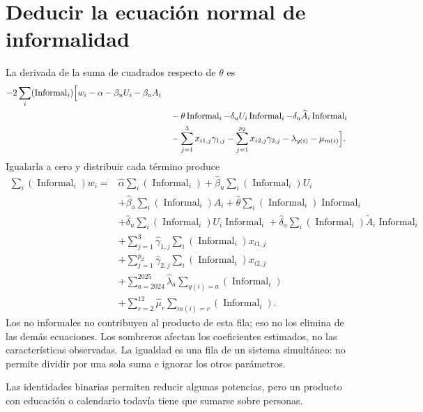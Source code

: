 \documentclass[11pt,a4paper]{article}
\begin{document}
\section{Deducir la ecuación normal de informalidad}
La derivada de la suma de cuadrados respecto de $\theta$ es
\[
\begin{aligned}-2\sum_i(\operatorname{Informal}_i)\Bigl[w_i-\alpha-\beta_uU_i-\beta_aA_i\\&\quad-\theta\operatorname{Informal}_i-\delta_uU_i\operatorname{Informal}_i-\delta_a\widetilde A_i\operatorname{Informal}_i\\&\quad-\sum_{j=1}^3x_{i1,j}\gamma_{1,j}-\sum_{j=1}^{p_2}x_{i2,j}\gamma_{2,j}-\lambda_{y(i)}-\mu_{m(i)}\Bigr].\end{aligned}
\]
Igualarla a cero y distribuir cada término produce
\[
\begin{aligned}
\sum_i(\operatorname{Informal}_i)w_i={}&\widehat\alpha\sum_i(\operatorname{Informal}_i)
+\widehat\beta_u\sum_i(\operatorname{Informal}_i)U_i\\
&+\widehat\beta_a\sum_i(\operatorname{Informal}_i)A_i
+\widehat\theta\sum_i(\operatorname{Informal}_i)\operatorname{Informal}_i\\
&+\widehat\delta_u\sum_i(\operatorname{Informal}_i)U_i\operatorname{Informal}_i
+\widehat\delta_a\sum_i(\operatorname{Informal}_i)\widetilde A_i\operatorname{Informal}_i\\
&+\sum_{j=1}^3\widehat\gamma_{1,j}\sum_i(\operatorname{Informal}_i)x_{i1,j}\\
&+\sum_{j=1}^{p_2}\widehat\gamma_{2,j}\sum_i(\operatorname{Informal}_i)x_{i2,j}\\
&+\sum_{a=2024}^{2025}\widehat\lambda_a\sum_{y(i)=a}(\operatorname{Informal}_i)\\
&+\sum_{r=2}^{12}\widehat\mu_r\sum_{m(i)=r}(\operatorname{Informal}_i).\end{aligned}
\]
Los no informales no contribuyen al producto de esta fila; eso no los elimina de las demás ecuaciones.
Los sombreros afectan los coeficientes estimados, no las características observadas. La igualdad es una fila de un sistema simultáneo: no permite dividir por una sola suma e ignorar los otros parámetros.

Las identidades binarias permiten reducir algunas potencias, pero un producto con educación o calendario todavía tiene que sumarse sobre personas.

\clearpage
\end{document}
